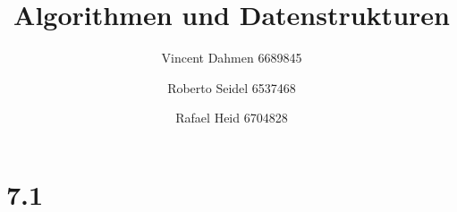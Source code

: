 \documentclass[12pt,a4paper]{article}
\title{Algorithmen und Datenstrukturen}
\author{Vincent Dahmen 6689845 \and Roberto Seidel 6537468 \and Rafael Heid 6704828}
\begin{document}
\maketitle{}


\section*{7.1}

%



\end{document}
